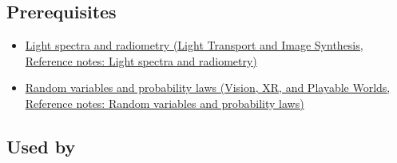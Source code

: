 \subsection{Prerequisites}\label{appendix-4815cd87ab8b-prerequisites}

\hypertarget{appendix-4815cd87ab8b-prerequisites}{}

\begin{itemize}
\tightlist
\item
  \href{../04-Light-Transport-and-Image-Synthesis/main.pdf\#nameddest=appendix-215c2570199b}{Light spectra and radiometry (Light Transport and Image Synthesis, Reference notes: Light spectra and radiometry)}
\item
  \href{../07-Vision-XR-and-Playable-Worlds/main.pdf\#nameddest=appendix-4d0203f7944f}{Random variables and probability laws (Vision, XR, and Playable Worlds, Reference notes: Random variables and probability laws)}
\end{itemize}

\subsection{Used by}\label{appendix-4815cd87ab8b-used-by}

\hypertarget{appendix-4815cd87ab8b-used-by}{}

